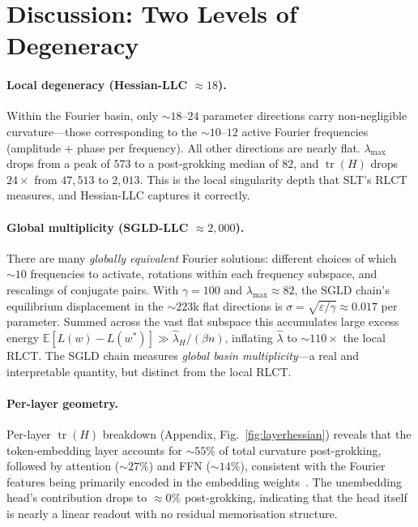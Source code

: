 \documentclass[12pt]{article}
\begin{document}
\section{Discussion: Two Levels of Degeneracy}
\label{sec:discussion}

\paragraph{Local degeneracy (Hessian-LLC $\approx 18$).}
Within the Fourier basin, only $\sim\!18$--$24$ parameter directions carry
non-negligible curvature—those corresponding to the $\sim\!10$--$12$ active
Fourier frequencies (amplitude + phase per frequency).  All other directions
are nearly flat.  $\lambda_{\max}$ drops from a peak of $573$ to a
post-grokking median of $82$, and $\operatorname{tr}(H)$ drops $24\times$
from $47{,}513$ to $2{,}013$.  This is the local singularity depth that SLT's
RLCT measures, and Hessian-LLC captures it correctly.

\paragraph{Global multiplicity (SGLD-LLC $\approx 2{,}000$).}
There are many \emph{globally equivalent} Fourier solutions: different choices
of which $\sim\!10$ frequencies to activate, rotations within each frequency
subspace, and rescalings of conjugate pairs.  With $\gamma=100$ and
$\lambda_{\max}\!\approx\!82$, the SGLD chain's equilibrium displacement in
the $\sim\!223$k flat directions is $\sigma = \sqrt{\varepsilon/\gamma}
\approx 0.017$ per parameter.  Summed across the vast flat subspace this
accumulates large excess energy $\mathbb{E}[L(w)-L(w^*)] \gg
\hat\lambda_H/(\beta n)$, inflating $\hat\lambda$ to $\sim\!110\times$ the
local RLCT.  The SGLD chain measures \emph{global basin multiplicity}—a
real and interpretable quantity, but distinct from the local RLCT.

\paragraph{Per-layer geometry.}
Per-layer $\operatorname{tr}(H)$ breakdown (Appendix,
Fig.~\ref{fig:layerhessian}) reveals that the token-embedding layer accounts
for $\sim\!55\%$ of total curvature post-grokking, followed by attention
($\sim\!27\%$) and FFN ($\sim\!14\%$), consistent with the Fourier features
being primarily encoded in the embedding weights~\citep{nanda2023progress}.
The unembedding head's contribution drops to $\approx\!0\%$ post-grokking,
indicating that the head itself is nearly a linear readout with no residual
memorisation structure.
\end{document}
